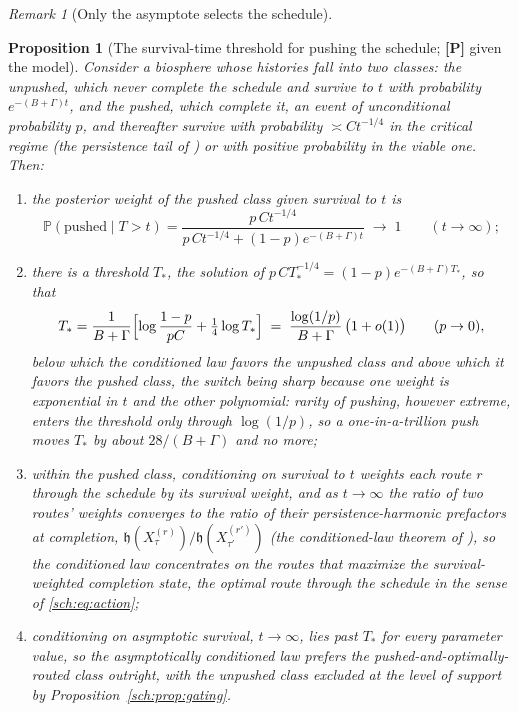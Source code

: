 \documentclass[11pt]{article}
\newcommand{\PP}{\mathbb{P}}
\newcommand{\hm}{\mathfrak{h}}
\theoremstyle{plain}
\newtheorem{proposition}[theorem]{Proposition}
\theoremstyle{definition}
\theoremstyle{remark}
\newtheorem{remark}[theorem]{Remark}
\begin{document}
\begin{remark}[Only the asymptote selects the schedule]
\begin{proposition}[The survival-time threshold for pushing the
schedule; \textbf{[P]} given the model]\label{sch:prop:threshold}
Consider a biosphere whose histories fall into two classes: the
\emph{unpushed}, which never complete the schedule and survive to $t$
with probability $e^{-(B+\Gamma)t}$, and the \emph{pushed}, which
complete it, an event of unconditional probability $p$, and thereafter
survive with probability $\asymp Ct^{-1/4}$ in the critical regime
(the persistence tail of \cite{SurvA}) or with positive probability in the viable
one. Then:
\begin{enumerate}[label=\emph{(\roman*)},itemsep=2pt]
\item the posterior weight of the pushed class given survival to $t$ is
\begin{equation}\label{sch:eq:pushposterior}
\PP(\text{pushed}\mid T>t)=\frac{p\,Ct^{-1/4}}{p\,Ct^{-1/4}+(1-p)e^{-(B+\Gamma)t}}
\;\longrightarrow\;1\qquad(t\to\infty);
\end{equation}
\item there is a threshold $T_\ast$, the solution of
$p\,CT_\ast^{-1/4}=(1-p)e^{-(B+\Gamma)T_\ast}$, so that
\begin{equation}\label{sch:eq:threshold}
T_\ast=\frac{1}{B+\Gamma}\Bigl[\log\frac{1-p}{pC}+\tfrac14\log T_\ast\Bigr]
\;=\;\frac{\log(1/p)}{B+\Gamma}\,\bigl(1+o(1)\bigr)\qquad(p\to0),
\end{equation}
below which the conditioned law favors the unpushed class and above
which it favors the pushed class, the switch being sharp because one
weight is exponential in $t$ and the other polynomial: rarity of
pushing, however extreme, enters the threshold only through
$\log(1/p)$, so a one-in-a-trillion push moves $T_\ast$ by about
$28/(B+\Gamma)$ and no more;
\item within the pushed class, conditioning on survival to $t$ weights
each route $r$ through the schedule by its survival weight, and as
$t\to\infty$ the ratio of two routes' weights converges to the ratio of
their persistence-harmonic prefactors at completion,
$\hm(X^{(r)}_\tau)/\hm(X^{(r')}_{\tau'})$ (the conditioned-law theorem of \cite{SurvA}), so the
conditioned law concentrates on the routes that maximize the
survival-weighted completion state, the \emph{optimal route} through
the schedule in the sense of \eqref{sch:eq:action};
\item conditioning on asymptotic survival, $t\to\infty$, lies past
$T_\ast$ for every parameter value, so the asymptotically conditioned
law prefers the pushed-and-optimally-routed class outright, with the
unpushed class excluded at the level of support by
Proposition~\ref{sch:prop:gating}.
\end{enumerate}
\end{proposition}


\end{remark}
\end{document}
